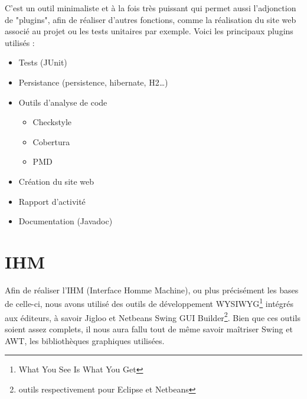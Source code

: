 C’est un outil minimaliste et à la fois très puissant qui permet aussi l’adjonction de "plugins", afin de réaliser d’autres fonctions, comme la réalisation du site web associé au projet ou les tests unitaires par exemple.
Voici les principaux plugins utilisés :
\begin{itemize}
\item Tests (JUnit)
\item Persistance (persistence, hibernate, H2…)
\item Outils d’analyse de code
	\begin{itemize}
	\item Checkstyle
	\item Cobertura 
	\item PMD
	\end{itemize}
\item Création du site web
\item Rapport d’activité
\item Documentation (Javadoc)
\end{itemize}

\section{IHM}

Afin de réaliser l’IHM (Interface Homme Machine), ou plus précisément les bases de celle-ci, nous avons utilisé des outils de développement WYSIWYG\footnote{What You See Is What You Get} intégrés aux éditeurs, à savoir Jigloo et Netbeans Swing GUI Builder\footnote{outils respectivement pour Eclipse et Netbeans}.
Bien que ces outils soient assez complets, il nous aura fallu tout de même savoir maîtriser Swing et AWT, les bibliothèques graphiques utilisées.
